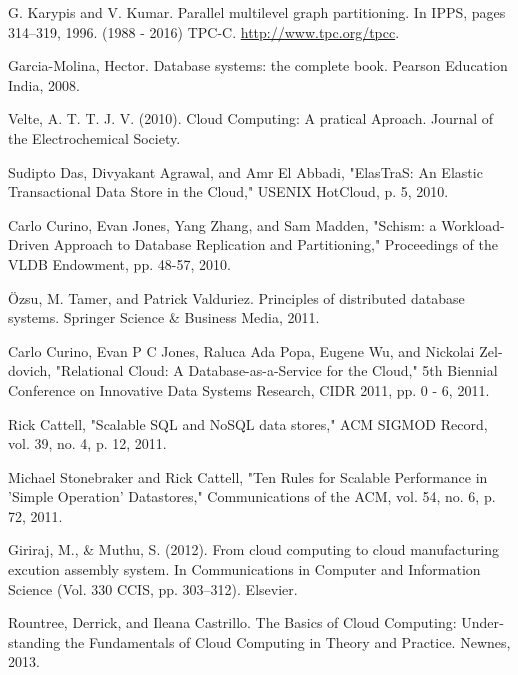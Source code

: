 
\begin{thebibliography}{9}
	\begin{latin}
		 G. Karypis and V. Kumar. Parallel multilevel graph partitioning. In IPPS, pages 314–319, 1996.
		 (1988 - 2016) TPC-C. \href{http://www.tpc.org/tpcc}{http://www.tpc.org/tpcc}.
		
		 Garcia-Molina, Hector. Database systems: the complete book. Pearson Education India, 2008.
		
		 Velte, A. T. T. J. V. (2010). Cloud Computing: A pratical Aproach. Journal of the Electrochemical Society.
		
		 Sudipto Das, Divyakant Agrawal, and Amr El Abbadi, "ElasTraS: An Elastic Transactional Data Store in the Cloud," USENIX HotCloud, p. 5, 2010.
				
		 Carlo Curino, Evan Jones, Yang Zhang, and Sam Madden, "Schism: a Workload-Driven Approach to Database Replication and Partitioning," Proceedings of the VLDB Endowment, pp. 48-57, 2010.

		 Özsu, M. Tamer, and Patrick Valduriez. Principles of distributed database systems. Springer Science \& Business Media, 2011.
		
		 Carlo Curino, Evan P C Jones, Raluca Ada Popa, Eugene Wu, and Nickolai Zeldovich, "Relational Cloud: A Database-as-a-Service for the Cloud," 5th Biennial Conference on Innovative Data Systems Research, CIDR 2011, pp. 0 - 6, 2011.

		 Rick Cattell, "Scalable SQL and NoSQL data stores," ACM SIGMOD Record, vol. 39, no. 4, p. 12, 2011.

		 Michael Stonebraker and Rick Cattell, "Ten Rules for Scalable Performance in 'Simple Operation' Datastores," Communications of the ACM, vol. 54, no. 6, p. 72, 2011.

		 Giriraj, M., \& Muthu, S. (2012). From cloud computing to cloud manufacturing excution assembly system. In Communications in Computer and Information Science (Vol. 330 CCIS, pp. 303–312). Elsevier.
		
		 Rountree, Derrick, and Ileana Castrillo. The Basics of Cloud Computing: Understanding the Fundamentals of Cloud Computing in Theory and Practice. Newnes, 2013. 


\end{latin}
\end{thebibliography}
